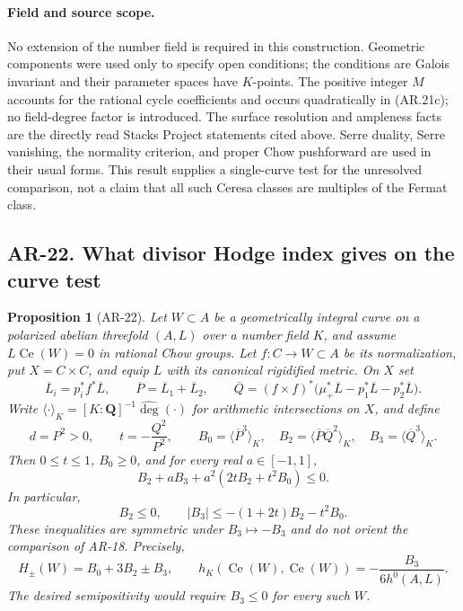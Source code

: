 \documentclass[11pt,a4paper]{article}
\newtheorem{proposition}[theorem]{Proposition}
\begin{document}
\paragraph{Field and source scope.}
No extension of the number field is required in this construction.
Geometric components were used only to specify open conditions; the
conditions are Galois invariant and their parameter spaces have
$K$-points.  The positive integer $M$ accounts for the rational cycle
coefficients and occurs quadratically in (AR.21c); no field-degree
factor is introduced.  The surface resolution and ampleness facts
are the directly read Stacks Project statements cited above.  Serre
duality, Serre vanishing, the normality criterion, and proper Chow
pushforward are used in their usual forms.  This result supplies a
single-curve test for the unresolved comparison, not a claim that
all such Ceresa classes are multiples of the Fermat class.
\subsection*{AR-22. What divisor Hodge index gives on the curve test}

\begin{proposition}[AR-22]
Let $W\subset A$ be a geometrically integral curve on a polarized
abelian threefold $(A,L)$ over a number field $K$, and assume
$L\operatorname{Ce}(W)=0$ in rational Chow groups.  Let
$f:C\to W\subset A$ be its normalization, put $X=C\times C$, and
equip $L$ with its canonical rigidified metric.  On $X$ set
\[
 \overline L_i=p_i^*f^*\overline L,\qquad
 \overline P=\overline L_1+\overline L_2,\qquad
 \overline Q=(f\times f)^*
 \bigl(\mu_+^*\overline L-p_1^*\overline L-p_2^*\overline L\bigr).
\]
Write $\langle\cdot\rangle_K=[K:\mathbf Q]^{-1}\widehat{\deg}(\cdot)$
for arithmetic intersections on $X$, and define
\[
 d=P^2>0,\qquad t=-\frac{Q^2}{P^2},\qquad
 B_0=\langle\overline P^3\rangle_K,\quad
 B_2=\langle\overline P\overline Q^2\rangle_K,\quad
 B_3=\langle\overline Q^3\rangle_K.
\]
Then $0\le t\le1$, $B_0\ge0$, and for every real $a\in[-1,1]$,
\[
 B_2+aB_3+a^2(2tB_2+t^2B_0)\le0.                 \tag{AR.22a}
\]
In particular,
\[
 B_2\le0,\qquad
 |B_3|\le -(1+2t)B_2-t^2B_0.                    \tag{AR.22b}
\]
These inequalities are symmetric under $B_3\mapsto-B_3$ and do not
orient the comparison of AR-18.  Precisely,
\[
 H_\pm(W)=B_0+3B_2\pm B_3,\qquad
 h_K(\operatorname{Ce}(W),\operatorname{Ce}(W))
       =-\frac{B_3}{6h^0(A,L)}.                  \tag{AR.22c}
\]
The desired semipositivity would require $B_3\le0$ for every such $W$.
\end{proposition}
\end{document}
